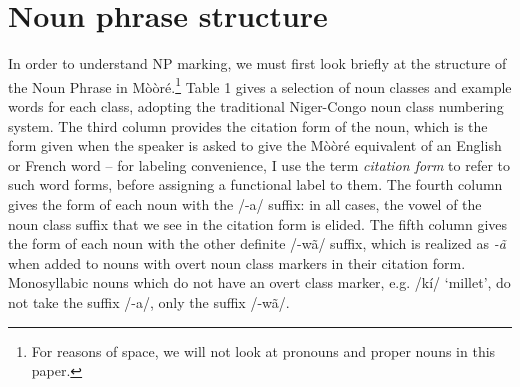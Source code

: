\documentclass[output=paper]{langsci/langscibook}
\begin{document}
\section{Noun phrase structure}\label{sec:teo:4}
In order to understand NP marking, we must first look briefly at the structure of the Noun Phrase in Mòòré.\footnote{For reasons of space, we will not look at pronouns and proper nouns in this paper.} Table 1 gives a selection of noun classes and example words for each class, adopting the traditional Niger-Congo noun class numbering system. The third column provides the citation form of the noun, which is the form given when the speaker is asked to give the Mòòré equivalent of an English or French word – for labeling convenience, I use the term \textit{citation form} to refer to such word forms, before assigning a functional label to them. The fourth column gives the form of each noun with the /\nobreakdash-a/\textit{ }suffix: in all cases, the vowel of the noun class suffix that we see in the citation form is elided. The fifth column gives the form of each noun with the other definite /-w\~{a}/\textit{ }suffix, which is realized as \textit{\nobreakdash-\~{a}} when added to nouns with overt noun class markers in their citation form. Monosyllabic nouns which do not have an overt class marker, e.g. /kí/ ‘millet’, do not take the suffix /-a/, only the suffix /-w\~{a}/.
\end{document}
